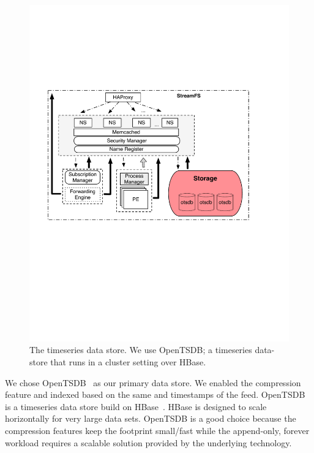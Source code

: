 \begin{figure}[h!] %
\centering
\includegraphics[width=.55\columnwidth]{figs/tsdstore}
\caption{The timeseries data store.  We use OpenTSDB; a timeseries data-store that runs in a cluster setting over
HBase.}
\label{fig:tsdb}
\end{figure}

We chose OpenTSDB~\cite{opentsdb} as our primary data store. We enabled the compression feature and indexed based on the same and timestamps 
of the feed.  OpenTSDB is a timeseries data store build on HBase~\cite{HBase}.  HBase is designed to scale horizontally for very
large data sets.  OpenTSDB is a good choice because the compression features keep the footprint small/fast while the append-only, forever
workload requires a scalable solution provided by the underlying technology.

